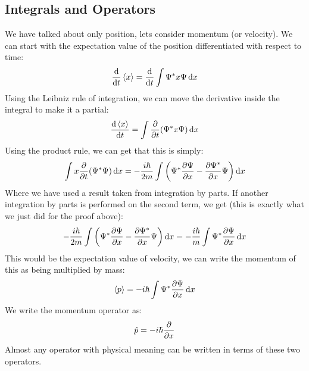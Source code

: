 \subsection{Integrals and Operators}
We have talked about only position, lets consider momentum (or velocity). We can start with the expectation value of the position differentiated with respect to time:
\begin{equation*}
  \dv{t}\ev{x}=\dv{t}\int\Psi^*x\Psi\dd{x}
\end{equation*}
Using the Leibniz rule of integration, we can move the derivative inside the integral to make it a partial:
\begin{equation*}
  \dv{\ev{x}}{t}=\int\pdv{t}\qty(\Psi^*x\Psi)\dd{x}
\end{equation*}
Using the product rule, we can get that this is simply:
\begin{equation*}
  \int x\pdv{t}\qty(\Psi^*\Psi)\dd{x}
  =-\dfrac{i\hbar}{2m}\int\qty(\Psi^*\pdv{\Psi}{x}-\pdv{\Psi^*}{x}\Psi)\dd{x}
\end{equation*}
Where we have used a result taken from integration by parts. If another integration by parts is performed on the second term, we get (this is exactly what we just did for the proof above):
\begin{equation*}
  -\dfrac{i\hbar}{2m}\int\qty(\Psi^*\pdv{\Psi}{x}-\pdv{\Psi^*}{x}\Psi)\dd{x}=
  -\dfrac{i\hbar}{m}\int\Psi^*\pdv{\Psi}{x}\dd{x}
\end{equation*}
This would be the expectation value of velocity, we can write the momentum of this as being multiplied by mass:
\begin{equation*}
  \ev{p}=-i\hbar\int\Psi^*\pdv{\Psi}{x}\dd{x}
\end{equation*}
We write the momentum operator as:
\begin{equation*}
  \hat{p}=-i\hbar\pdv{x}
\end{equation*}
Almost any operator with physical meaning can be written in terms of these two operators. 
